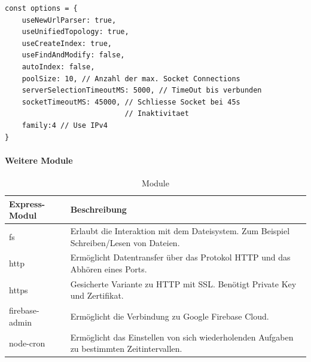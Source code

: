 \begin{lstlisting}[caption=Mongoose Verbindungsoptionen \protect \footnotemark  ,label=lst:MongooseConnect]
const options = {
	useNewUrlParser: true,
	useUnifiedTopology: true,
	useCreateIndex: true,
	useFindAndModify: false,
	autoIndex: false,
	poolSize: 10, // Anzahl der max. Socket Connections
	serverSelectionTimeoutMS: 5000, // TimeOut bis verbunden
	socketTimeoutMS: 45000, // Schliesse Socket bei 45s                 
	                        // Inaktivitaet
	family:4 // Use IPv4
}
\end{lstlisting}


\paragraph{Weitere Module}

\begin{table}[tbt]
\caption{Module}
\begin{center}
    \begin{tabular}{| l | p{8cm} |}
    \hline
    Express-Modul & Beschreibung \\ \hline
    fs & Erlaubt die Interaktion mit dem Dateisystem.\newline
	Zum Beispiel Schreiben/Lesen von Dateien.\\
    
    \hline
    http & Ermöglicht Datentransfer über das Protokol HTTP und das Abhören eines Ports.  \\
    
    \hline
	https & Gesicherte Variante zu HTTP mit SSL.\newline
	Benötigt Private Key und Zertifikat.  \\
	
    \hline    
    firebase-admin & Ermöglicht die Verbindung zu Google Firebase 			Cloud. \\ 
    
    \hline    
    node-cron & Ermöglicht das Einstellen von sich wiederholenden 			Aufgaben zu bestimmten Zeitintervallen.  \\
    \hline
    \end{tabular}
\end{center}
\end{table}

